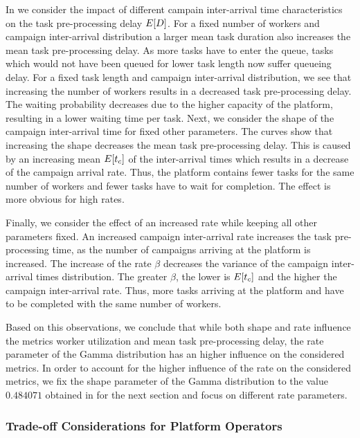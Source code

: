 In  we consider the impact of different campain inter-arrival time characteristics on the task pre-processing delay \(E[D]\).
For a fixed number of workers and campaign inter-arrival distribution a larger mean task duration also increases the mean task pre-processing delay. 
As more tasks have to enter the queue, tasks which would not have been queued for lower task length now suffer queueing delay.
For a fixed task length and campaign inter-arrival distribution, we see that increasing the number of workers results in a decreased task pre-processing delay.
The waiting probability decreases due to the higher capacity of the platform, resulting in a lower waiting time per task.
Next, we consider the shape of the campaign inter-arrival time for fixed other parameters. 
The curves show that increasing the shape decreases the mean task pre-processing delay. 
This is caused by an increasing mean \(E[t_c]\) of the inter-arrival times which results in a decrease of the campaign arrival rate.
Thus, the platform contains fewer tasks for the same number of workers and fewer tasks have to wait for completion.
The effect is more obvious for high rates.

Finally, we consider the effect of an increased rate while keeping all other parameters fixed.
An increased campaign inter-arrival rate increases the task pre-processing time, as the number of campaigns arriving at the platform is increased.
The increase of the rate \(\beta\) decreases the variance of the campaign inter-arrival times distribution.
The greater \(\beta\), the lower is \(E[t_c]\) and the higher the campaign inter-arrival rate. 
Thus, more tasks arriving at the platform and have to be completed with the same number of workers.

Based on this observations, we conclude that while both shape and rate influence the metrics worker utilization and mean task pre-processing delay, the rate parameter of the Gamma distribution has an higher influence on the considered metrics.
In order to account for the higher influence of the rate on the considered metrics, we fix the shape parameter of the Gamma distribution to the value \(0.484071\) obtained in  for the next section and focus on different rate parameters.

\subsubsection*{Trade-off Considerations for Platform Operators}

